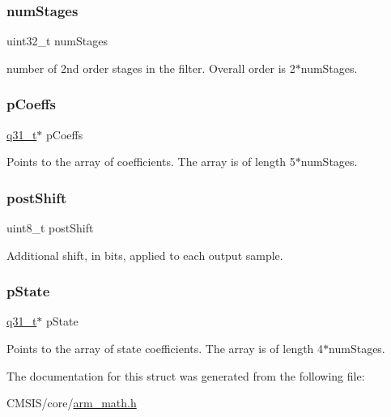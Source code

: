 \subsubsection{\texorpdfstring{numStages}{numStages}}
{\footnotesize\ttfamily uint32\+\_\+t num\+Stages}

number of 2nd order stages in the filter. Overall order is 2$\ast$num\+Stages. \mbox{\label{structarm__biquad__casd__df1__inst__q31_a68888e36167d81cb7836db10367a1682}} 
\subsubsection{\texorpdfstring{pCoeffs}{pCoeffs}}
{\footnotesize\ttfamily \mbox{\hyperlink{arm__math_8h_adc89a3547f5324b7b3b95adec3806bc0}{q31\+\_\+t}}$\ast$ p\+Coeffs}

Points to the array of coefficients. The array is of length 5$\ast$num\+Stages. \mbox{\label{structarm__biquad__casd__df1__inst__q31_a74050e9f36542bd56f4052381a82ae8f}} 
\subsubsection{\texorpdfstring{postShift}{postShift}}
{\footnotesize\ttfamily uint8\+\_\+t post\+Shift}

Additional shift, in bits, applied to each output sample. \mbox{\label{structarm__biquad__casd__df1__inst__q31_adee4ba3ee8869865af7d8fa08ca913d6}} 
\subsubsection{\texorpdfstring{pState}{pState}}
{\footnotesize\ttfamily \mbox{\hyperlink{arm__math_8h_adc89a3547f5324b7b3b95adec3806bc0}{q31\+\_\+t}}$\ast$ p\+State}

Points to the array of state coefficients. The array is of length 4$\ast$num\+Stages. 

The documentation for this struct was generated from the following file\+:\begin{DoxyCompactItemize}
\item 
C\+M\+S\+I\+S/core/\mbox{\hyperlink{arm__math_8h}{arm\+\_\+math.\+h}}\end{DoxyCompactItemize}
